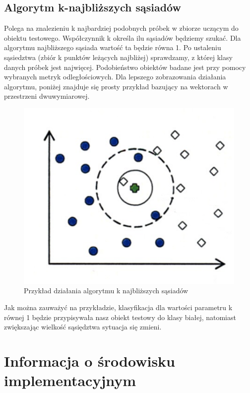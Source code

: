 \documentclass[12pt]{article}
\begin{document}
\subsection{Algorytm k-najbliższych sąsiadów}
\indent Polega na znalezieniu k najbardziej podobnych próbek w zbiorze uczącym do obiektu testowego. Współczynnik k określa ilu sąsiadów będziemy szukać. Dla algorytmu najbliższego sąsiada wartość ta będzie równa 1. Po ustaleniu sąsiedztwa (zbiór k punktów leżących najbliżej) sprawdzamy, z której klasy danych próbek jest najwięcej. Podobieństwo obiektów badane jest przy pomocy wybranych metryk odległościowych. Dla lepszego zobrazowania działania algorytmu, poniżej znajduje się prosty przykład bazujący na wektorach w przestrzeni dwuwymiarowej. \newline
\begin{figure}[H]
	\centering
		\includegraphics[scale=1]{images/knn_example.png}
	\caption{Przykład działania algorytmu k najbliższych sąsiadów \cite{bib3}}
\end{figure}

\indent Jak można zauważyć na przykładzie, klasyfikacja dla wartości parametru k równej 1 będzie przypisywała nasz obiekt testowy do klasy białej, natomiast zwiększając wielkość sąsiędztwa sytuacja się zmieni.
\section{Informacja o środowisku implementacyjnym}
\end{document}
